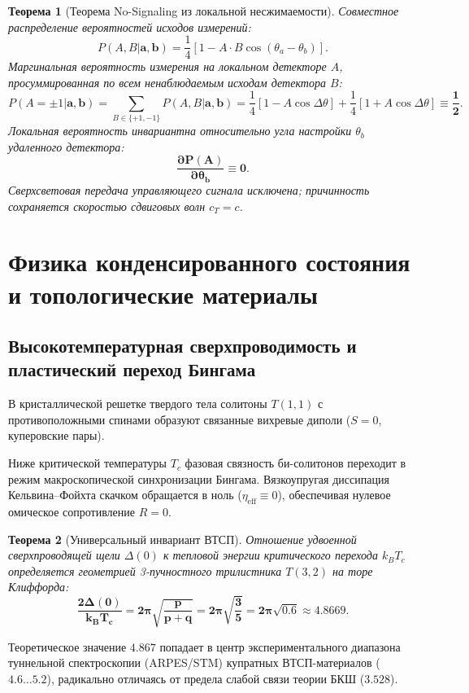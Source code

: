 \documentclass[11pt,a4paper,oneside]{article}
\theoremstyle{plain}
\newtheorem{theorem}{Теорема}[section]
\theoremstyle{definition}
\theoremstyle{remark}
\numberwithin{equation}{section}
\begin{document}
\begin{theorem}[Теорема No-Signaling из локальной несжимаемости]
Совместное распределение вероятностей исходов измерений:
\begin{equation}
	P(A, B | \mathbf{a}, \mathbf{b}) = \frac{1}{4} \left[ 1 - A \cdot B \cos(\theta_a - \theta_b) \right].
\end{equation}
Маргинальная вероятность измерения на локальном детекторе $A$, просуммированная по всем ненаблюдаемым исходам детектора $B$:
\begin{equation}
	P(A = \pm 1 | \mathbf{a}, \mathbf{b}) = \sum_{B \in \{+1, -1\}} P(A, B | \mathbf{a}, \mathbf{b}) = \frac{1}{4} [1 - A \cos\Delta\theta] + \frac{1}{4} [1 + A \cos\Delta\theta] \equiv \mathbf{\frac{1}{2}}.
\end{equation}
Локальная вероятность инвариантна относительно угла настройки $\theta_b$ удаленного детектора:
\begin{equation}
	\mathbf{\frac{\partial P(A)}{\partial \theta_b} \equiv 0}.
\end{equation}
Сверхсветовая передача управляющего сигнала исключена; причинность сохраняется скоростью сдвиговых волн $c_T = c$.
\end{theorem}

\section{Физика конденсированного состояния и топологические материалы}

\subsection{Высокотемпературная сверхпроводимость и пластический переход Бингама}

В кристаллической решетке твердого тела солитоны $T(1,1)$ с противоположными спинами образуют связанные вихревые диполи ($S=0$, куперовские пары). 

Ниже критической температуры $T_c$ фазовая связность би-солитонов переходит в режим макроскопической синхронизации Бингама. Вязкоупругая диссипация Кельвина--Фойхта скачком обращается в ноль ($\eta_{\text{eff}} \equiv 0$), обеспечивая нулевое омическое сопротивление $R = 0$.

\begin{theorem}[Универсальный инвариант ВТСП]
Отношение удвоенной сверхпроводящей щели $\Delta(0)$ к тепловой энергии критического перехода $k_B T_c$ определяется геометрией 3-пучностного трилистника $T(3,2)$ на торе Клиффорда:
\begin{equation}
	\mathbf{\frac{2\Delta(0)}{k_B T_c} = 2\pi \sqrt{\frac{p}{p + q}} = 2\pi \sqrt{\frac{3}{5}} = 2\pi \sqrt{0.6} \approx \mathbf{4.8669}}.
	\label{eq:superconducting_universal_ratio}
\end{equation}
\end{theorem}
Теоретическое значение $4.867$ попадает в центр экспериментального диапазона туннельной спектроскопии (ARPES/STM) купратных ВТСП-материалов ($4.6 \dots 5.2$), радикально отличаясь от предела слабой связи теории БКШ ($3.528$).
\end{document}
